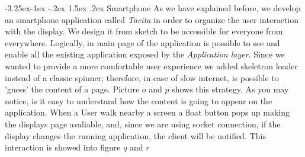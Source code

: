 \documentclass[]{usiinfbachelorproject}
\makeatletter
\newcommand\subsubsection{\@startsection{subsubsection}{3}{\z@}%
                {-3.25ex\@plus -1ex \@minus -.2ex}%
                {1.5ex \@plus .2ex}%
                {\normalfont\normalsize\bfseries}}
\makeatother
\begin{document}
\subsubsection{Smartphone}
As we have explained before, we develop an smartphone application called \emph{Tacita} in order to organize the user interaction with the display. We design it from sketch to be accessible for everyone from everywhere. 
Logically, in main page of the application is possible to see and enable all the existing application exposed by the \emph{Application layer}. Since we wanted to provide a more comfortable user experience we added skeletron loader instead of a classic spinner; therefore, in case of slow internet, is possible to 'guess' the content of a page. Picture $o$ and $p$ shows this strategy. As you may notice, is it easy to understand how the content is going to appear on the application.
When a User walk nearby a screen a float button pops up making the displays page avaliable, and, since we are using socket connection, if the display changes the running application, the client will be notified. This interaction is showed into figure $q$ and $r$
\end{document}
